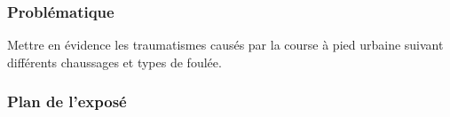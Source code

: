 \begin{frame}
    \titlepage
\end{frame}

\begin{frame}
    \frametitle{Problématique}
    Mettre en évidence les traumatismes causés par la course à pied urbaine suivant différents chaussages et types de foulée.
\end{frame}

\begin{frame}
    \frametitle{Plan de l'exposé}
    \tableofcontents
\end{frame}
